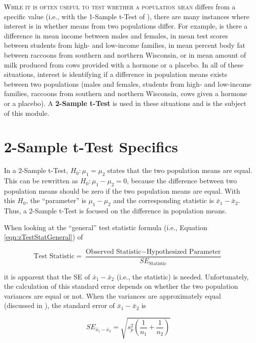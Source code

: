 \documentclass[10pt,openany]{book}\usepackage[]{graphicx}\usepackage[]{color}
\begin{document}
\lettrine{W}{hile it is often useful to test whether a population mean} differs from a specific value (i.e., with the 1-Sample t-Test of ), there are many instances where interest is in whether means from two populations differ. For example, is there a difference in mean income between males and females, in mean test scores between students from high- and low-income families, in mean percent body fat between raccoons from southern and northern Wisconsin, or in mean amount of milk produced from cows provided with a hormone or a placebo. In all of these situations, interest is identifying if a difference in population means exists between two populations (males and females, students from high- and low-income families, raccoons from southern and northern Wisconsin, cows given a hormone or a placebo). A \textbf{2-Sample t-Test} is used in these situations and is the subject of this module.


\section{2-Sample t-Test Specifics}
\vspace*{-3pt}
In a 2-Sample t-Test, $H_{0}:\mu_{1}=\mu_{2}$ states that the two population means are equal. This can be rewritten as $H_{0}:\mu_{1}-\mu_{2}=0$, because the difference between two population means should be zero if the two population means are equal. With this $H_{0}$, the ``parameter'' is $\mu_{1}-\mu_{2}$ and the corresponding statistic is $\bar{x}_{1}-\bar{x}_{2}$. Thus, a 2-Sample t-Test is focused on the difference in population means.

When looking at the ``general'' test statistic formula (i.e., Equation \eqref{eqn:zTestStatGeneral}) of

\vspace*{-6pt}
\[ \text{Test Statistic} = \frac{\text{Observed Statistic}-\text{Hypothesized Parameter}}{SE_{\text{Statistic}}} \]
\vspace*{-6pt}

it is apparent that the SE of $\bar{x}_{1}-\bar{x}_{2}$ (i.e., the statistic) is needed. Unfortunately, the calculation of this standard error depends on whether the two population variances are equal or not. When the variances are approximately equal (discussed in ), the standard error of $\bar{x}_{1}-\bar{x}_{2}$ is

\[ SE_{\bar{x}_{1}-\bar{x}_{2}}= \sqrt{s_{p}^{2}\left(\frac{1}{n_{1}}+\frac{1}{n_{2}} \right)}  \]
\end{document}
